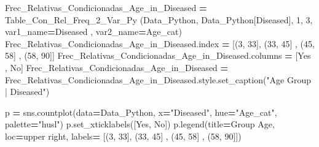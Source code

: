 \documentclass[
  11pt,
  a4paper,
]{article}
\newenvironment{Shaded}{\begin{snugshade}}{\end{snugshade}}
\newcommand{\DecValTok}[1]{\textcolor[rgb]{0.00,0.00,0.81}{#1}}
\newcommand{\NormalTok}[1]{#1}
\newcommand{\OperatorTok}[1]{\textcolor[rgb]{0.81,0.36,0.00}{\textbf{#1}}}
\newcommand{\StringTok}[1]{\textcolor[rgb]{0.31,0.60,0.02}{#1}}
\begin{document}
\begin{Shaded}
\begin{Highlighting}[]
\NormalTok{Frec\_Relativas\_Condicionadas\_Age\_in\_Diseased }\OperatorTok{=}\NormalTok{ Table\_Con\_Rel\_Freq\_2\_Var\_Py (Data\_Python, Data\_Python[}\StringTok{\textquotesingle{}Diseased\textquotesingle{}}\NormalTok{], }\DecValTok{1}\NormalTok{, }\DecValTok{3}\NormalTok{, var1\_name}\OperatorTok{=}\StringTok{\textquotesingle{}Diseased\textquotesingle{}}\NormalTok{ , var2\_name}\OperatorTok{=}\StringTok{\textquotesingle{}Age\_cat\textquotesingle{}}\NormalTok{)}
\NormalTok{Frec\_Relativas\_Condicionadas\_Age\_in\_Diseased.index }\OperatorTok{=}\NormalTok{ [}\StringTok{\textquotesingle{}(3, 33]\textquotesingle{}}\NormalTok{, }\StringTok{\textquotesingle{}(33, 45]\textquotesingle{}}\NormalTok{ , }\StringTok{\textquotesingle{}(45, 58]\textquotesingle{}}\NormalTok{ , }\StringTok{\textquotesingle{}(58, 90]\textquotesingle{}}\NormalTok{]}
\NormalTok{Frec\_Relativas\_Condicionadas\_Age\_in\_Diseased.columns }\OperatorTok{=}\NormalTok{ [}\StringTok{\textquotesingle{}Yes\textquotesingle{}}\NormalTok{ , }\StringTok{\textquotesingle{}No\textquotesingle{}}\NormalTok{]}
\NormalTok{Frec\_Relativas\_Condicionadas\_Age\_in\_Diseased }\OperatorTok{=}\NormalTok{ Frec\_Relativas\_Condicionadas\_Age\_in\_Diseased.style.set\_caption(}\StringTok{"Age Group | Diseased"}\NormalTok{)}
\end{Highlighting}
\end{Shaded}

\begin{Shaded}
\begin{Highlighting}[]
\NormalTok{p }\OperatorTok{=}\NormalTok{ sns.countplot(data}\OperatorTok{=}\NormalTok{Data\_Python, x}\OperatorTok{=}\StringTok{"Diseased"}\NormalTok{, hue}\OperatorTok{=}\StringTok{"Age\_cat"}\NormalTok{, palette}\OperatorTok{=}\StringTok{"husl"}\NormalTok{)}
\NormalTok{p.set\_xticklabels([}\StringTok{\textquotesingle{}Yes\textquotesingle{}}\NormalTok{, }\StringTok{\textquotesingle{}No\textquotesingle{}}\NormalTok{])}
\NormalTok{p.legend(title}\OperatorTok{=}\StringTok{\textquotesingle{}Group Age\textquotesingle{}}\NormalTok{, loc}\OperatorTok{=}\StringTok{\textquotesingle{}upper right\textquotesingle{}}\NormalTok{, labels}\OperatorTok{=}\NormalTok{ [}\StringTok{\textquotesingle{}(3, 33]\textquotesingle{}}\NormalTok{, }\StringTok{\textquotesingle{}(33, 45]\textquotesingle{}}\NormalTok{ , }\StringTok{\textquotesingle{}(45, 58]\textquotesingle{}}\NormalTok{ , }\StringTok{\textquotesingle{}(58, 90]\textquotesingle{}}\NormalTok{])}
\end{Highlighting}
\end{Shaded}
\end{document}
